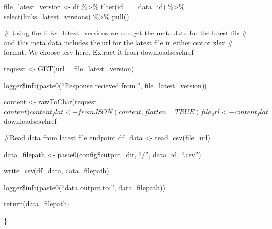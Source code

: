 \documentclass[
  letterpaper,
]{book}
\begin{document}
file\_latest\_version \textless- df \%\textgreater\% filter(id ==
data\_id) \%\textgreater\% select(links\_latest\_versions)
\%\textgreater\% pull()

\# Using the links\_latest\_versions we can get the meta data for the
latest file \# and this meta data includes the url for the latest file
in either csv or xlsx \# format. We choose .csv here. Extract it from
downloads\(csv\)href

request \textless- GET(url = file\_latest\_version)

logger\$info(paste0(``Response recieved from:'', file\_latest\_version))

content \textless-
rawToChar(request\(content)  content_flat <- fromJSON(content, flatten=TRUE)  file_url <- content_flat\)downloads\(csv\)href

\#Read data from latest file endpoint df\_data \textless-
read\_csv(file\_url)

data\_filepath \textless- paste0(config\$output\_dir, ``/'', data\_id,
``.csv'')

write\_csv(df\_data, data\_filepath)

logger\$info(paste0(``data output to:'', data\_filepath))

return(data\_filepath)

\}
\end{document}
